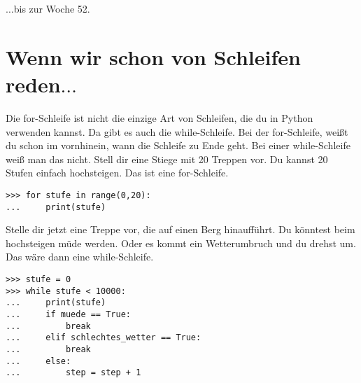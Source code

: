 $\ldots$bis zur Woche 52.

\section{Wenn wir schon von Schleifen reden$\ldots$}

Die for-Schleife ist nicht die einzige Art von Schleifen, die du in Python verwenden kannst. Da gibt es auch die while-Schleife. Bei der for-Schleife, weißt du schon im vornhinein, wann die Schleife zu Ende geht. Bei einer while-Schleife weiß man das nicht. Stell dir eine Stiege mit 20 Treppen vor. Du kannst 20 Stufen einfach hochsteigen. Das ist eine for-Schleife.

\begin{Verbatim}[frame=single]
>>> for stufe in range(0,20):
...     print(stufe)
\end{Verbatim}

Stelle dir jetzt eine Treppe vor, die auf einen Berg hinaufführt. Du könntest beim hochsteigen müde werden. Oder es kommt ein Wetterumbruch und du drehst um. Das wäre dann eine while-Schleife.

\begin{Verbatim}[frame=single]
>>> stufe = 0
>>> while stufe < 10000:
...     print(stufe)
...     if muede == True:
...         break
...     elif schlechtes_wetter == True:
...         break
...     else:
...         step = step + 1
\end{Verbatim}

